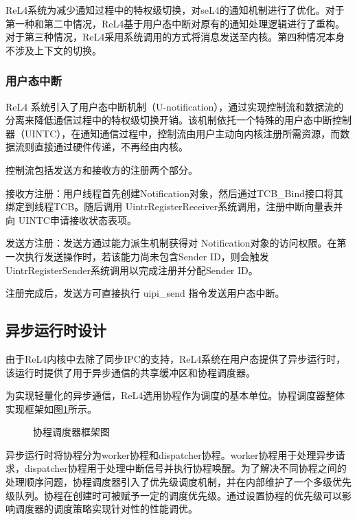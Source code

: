 ReL4系统为减少通知过程中的特权级切换，对seL4的通知机制进行了优化。对于第一种和第二中情况，ReL4基于用户态中断对原有的通知处理逻辑进行了重构。对于第三种情况，ReL4采用系统调用的方式将消息发送至内核。第四种情况本身不涉及上下文的切换。

\subsubsection{用户态中断}

ReL4 系统引入了用户态中断机制（U-notification），通过实现控制流和数据流的分离来降低通信过程中的特权级切换开销。该机制依托一个特殊的用户态中断控制器（UINTC），在通知通信过程中，控制流由用户主动向内核注册所需资源，而数据流则直接通过硬件传递，不再经由内核。

控制流包括发送方和接收方的注册两个部分。

接收方注册：用户线程首先创建Notification对象，然后通过TCB\_Bind接口将其绑定到线程TCB。随后调用 UintrRegisterReceiver系统调用，注册中断向量表并向 UINTC申请接收状态表项。

发送方注册：发送方通过能力派生机制获得对 Notification对象的访问权限。在第一次执行发送操作时，若该能力尚未包含Sender ID，则会触发UintrRegisterSender系统调用以完成注册并分配Sender ID。

注册完成后，发送方可直接执行 uipi\_send 指令发送用户态中断。

\subsection{异步运行时设计}

由于ReL4内核中去除了同步IPC的支持，ReL4系统在用户态提供了异步运行时，该运行时提供了用于异步通信的共享缓冲区和协程调度器。

为实现轻量化的异步通信，ReL4选用协程作为调度的基本单位。协程调度器整体实现框架如图\ref{Executor}所示。

\begin{figure}[htbp]
    \centering
    
    \caption{协程调度器框架图}\label{Executor}
\end{figure}


异步运行时将协程分为worker协程和dispatcher协程。worker协程用于处理异步请求，dispatcher协程用于处理中断信号并执行协程唤醒。为了解决不同协程之间的处理顺序问题，协程调度器引入了优先级调度机制，并在内部维护了一个多级优先级队列。协程在创建时可被赋予一定的调度优先级。通过设置协程的优先级可以影响调度器的调度策略实现针对性的性能调优。

